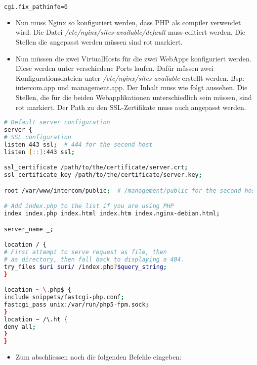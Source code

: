 \begin{lstlisting}[backgroundcolor = \color{snippetcolor},
language = bash,
xleftmargin = 0.5cm,
framexleftmargin = 0.1em,
breaklines=true]
	cgi.fix_pathinfo=0
\end{lstlisting}

\begin{itemize}
	\item 
	Nun muss Nginx so konfiguriert werden, dass PHP als compiler verwendet wird. Die Datei \textit{/etc/nginx/sites-available/default} muss editiert werden. Die Stellen die angepasst werden müssen sind rot markiert.
	\item 
	Nun müssen die zwei VirtualHosts für die zwei WebApps konfiguriert werden. Diese werden unter verschiedene Ports laufen. Dafür müssen zwei Konfigurationsdateien unter \textit{/etc/nginx/sites-available} erstellt werden. Bsp: intercom.app und management.app. Der Inhalt muss wie folgt aussehen. Die Stellen, die für die beiden Webapplikationen unterschiedlich sein müssen, sind rot markiert. Der Path zu den SSL-Zertifikate muss auch angepasst werden.
\end{itemize}

\begin{lstlisting}[backgroundcolor = \color{snippetcolor},
language = bash,
xleftmargin = 0.5cm,
framexleftmargin = 0.1em,
breaklines=true]
# Default server configuration
server {
# SSL configuration
listen 443 ssl;  # 444 for the second host
listen [::]:443 ssl;

ssl_certificate /path/to/the/certificate/server.crt;
ssl_certificate_key /path/to/the/certificate/server.key;

root /var/www/intercom/public;  # /management/public for the second host

# Add index.php to the list if you are using PHP
index index.php index.html index.htm index.nginx-debian.html;

server_name _;

location / {
# First attempt to serve request as file, then
# as directory, then fall back to displaying a 404.
try_files $uri $uri/ /index.php?$query_string;
}

location ~ \.php$ {
include snippets/fastcgi-php.conf;
fastcgi_pass unix:/var/run/php5-fpm.sock;
}
location ~ /\.ht {
deny all;
}
}
\end{lstlisting}

\begin{itemize}
	\item Zum abschliessen noch die folgenden Befehle eingeben:
\end{itemize}


